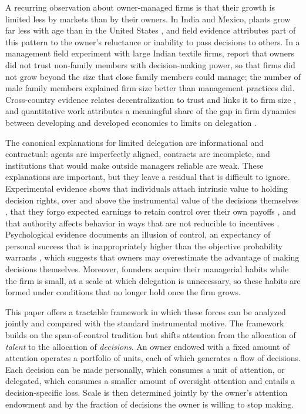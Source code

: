 \documentclass[11pt,a4paper]{article}
\theoremstyle{plain}
\begin{document}
A recurring observation about owner-managed firms is that their growth is limited less by markets than by their owners. In India and Mexico, plants grow far less with age than in the United States \citep{hsieh2014}, and field evidence attributes part of this pattern to the owner's reluctance or inability to pass decisions to others. In a management field experiment with large Indian textile firms, \citet{bloom2013} report that owners did not trust non-family members with decision-making power, so that firms did not grow beyond the size that close family members could manage; the number of male family members explained firm size better than management practices did. Cross-country evidence relates decentralization to trust and links it to firm size \citep{bloom2012}, and quantitative work attributes a meaningful share of the gap in firm dynamics between developing and developed economies to limits on delegation \citep{akcigit2021}.

The canonical explanations for limited delegation are informational and contractual: agents are imperfectly aligned, contracts are incomplete, and institutions that would make outside managers reliable are weak. These explanations are important, but they leave a residual that is difficult to ignore. Experimental evidence shows that individuals attach intrinsic value to holding decision rights, over and above the instrumental value of the decisions themselves \citep{bartling2014,owens2014}, that they forgo expected earnings to retain control over their own payoffs \citep{bobadilla2017}, and that authority affects behavior in ways that are not reducible to incentives \citep{fehr2013}. Psychological evidence documents an illusion of control, an expectancy of personal success that is inappropriately higher than the objective probability warrants \citep{langer1975}, which suggests that owners may overestimate the advantage of making decisions themselves. Moreover, founders acquire their managerial habits while the firm is small, at a scale at which delegation is unnecessary, so these habits are formed under conditions that no longer hold once the firm grows.

This paper offers a tractable framework in which these forces can be analyzed jointly and compared with the standard instrumental motive. The framework builds on the span-of-control tradition \citep{lucas1978,calvo1978,rosen1982,garicano2000} but shifts attention from the allocation of \emph{talent} to the allocation of \emph{decisions}. An owner endowed with a fixed amount of attention operates a portfolio of units, each of which generates a flow of decisions. Each decision can be made personally, which consumes a unit of attention, or delegated, which consumes a smaller amount of oversight attention and entails a decision-specific loss. Scale is then determined jointly by the owner's attention endowment and by the fraction of decisions the owner is willing to stop making.
\end{document}

